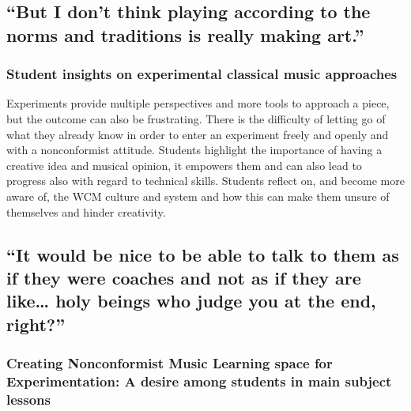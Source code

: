 \documentclass[authordate, empirical, issue]{jote-new-article}
\begin{document}
\subsection{“But I don't think playing according to the norms and traditions is really making art.”\protect\footnotemark}




\subsubsection{Student insights on experimental classical music approaches}



Experiments provide multiple perspectives and more tools to approach a piece, but the outcome can also be frustrating. There is the difficulty of letting go of what they already know in order to enter an experiment freely and openly and with a nonconformist attitude. Students highlight the importance of having a creative idea and musical opinion, it empowers them and can also lead to progress also with regard to technical skills. Students reflect on, and become more aware of, the WCM culture and system and how this can make them unsure of themselves and hinder creativity.

\subsection{“It would be nice to be able to talk to them as if they were coaches and not as if they are like… holy beings who judge you at the end, right?”\protect\footnotemark}


\subsubsection{Creating Nonconformist Music Learning space for Experimentation: A desire among students in main subject lessons}
\end{document}
